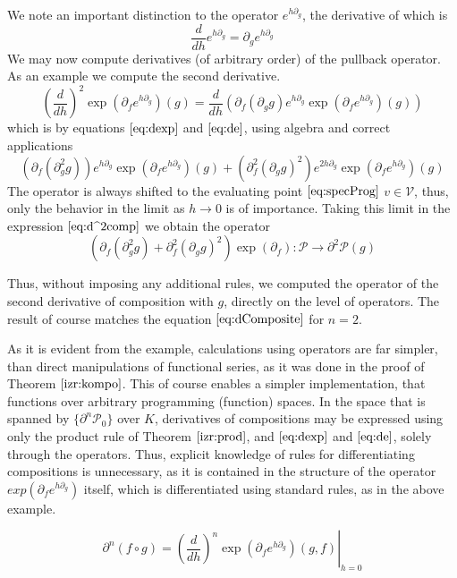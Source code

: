 \documentclass[smallcondensed]{svjour3}
\newcommand{\VV}{\mathcal{V}}
\newcommand{\dP}{\mathcal{P}}
\newcommand{\D}{\partial}
\begin{document}
 We note an important distinction to the operator $e^{h\D_g}$, the derivative of which is
 \begin{equation}\label{eq:de}
\frac{d}{dh}e^{h\D_g}=\D_ge^{h\D_g}
 \end{equation}
 We may now compute derivatives (of arbitrary order) of the pullback operator. As an example we compute the second derivative.
 $$\left(\frac{d}{dh}\right)^2\exp\left(\D_fe^{h\D_g}\right)(g)=\frac{d}{dh}\left(\D_f(\D_gg)e^{h\D_g}\exp\left(\D_fe^{h\D_g}\right)(g)\right)$$
 which is by equations $\eqref{eq:dexp}$ and $\eqref{eq:de}$, using algebra and correct applications
 \begin{equation}\label{eq:d^2comp}
 \left(\D_f(\D^2_gg)\right)e^{h\D_g}\exp(\D_fe^{h\D_g})(g)+(\D^2_f(\D_gg)^2)e^{2h\D_g}\exp(\D_fe^{h\D_g})(g)
 \end{equation}
 The operator is always shifted to the evaluating point $\eqref{eq:specProg}$ $v\in \VV$, thus, only the behavior in the limit as $h\to 0$ is of importance. Taking this limit in the expression $\eqref{eq:d^2comp}$ we obtain the operator
 \begin{equation}
	\left(\D_f(\D^2_gg)+\D^2_f(\D_gg)^2\right)\exp(\D_f):\dP\to\D^2\dP(g)
 \end{equation}
 
 Thus, without imposing any additional rules, we computed the operator of the second derivative of composition with $g$, directly on the level of operators. The result of course matches the equation $\eqref{eq:dComposite}$ for $n=2$.
 
 As it is evident from the example, calculations using operators are far simpler, than direct manipulations of functional series, as it was done in the proof of Theorem $\ref{izr:kompo}$. This of course enables a simpler implementation, that functions over arbitrary programming (function) spaces. In the space that is spanned by $\{\D^n\dP_0\}$ over $K$, derivatives of compositions may be expressed using only the product rule of Theorem $\ref{izr:prod}$, and $\eqref{eq:dexp}$ and $\eqref{eq:de}$, solely through the operators. Thus, explicit knowledge of rules for differentiating compositions is unnecessary, as it is contained in the structure of the operator $exp(\D_fe^{h\D_g})$ itself, which is differentiated using standard rules, as in the above example.
 
 \begin{equation}\label{eq:dkompo}
 \D^n(f\circ g)=\left.\left(\frac{d}{dh}\right)^n\exp\left(\D_fe^{h\D_g}\right)(g,f)\right|_{h=0}
 \end{equation}
 
\end{document}

